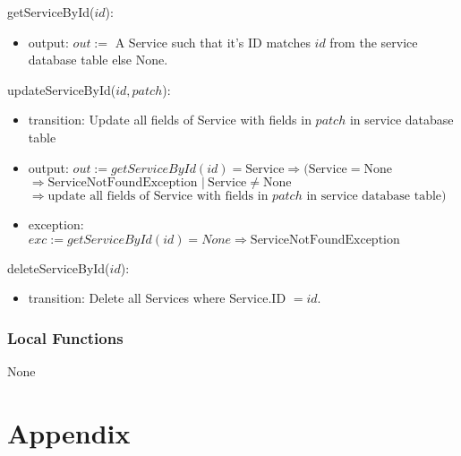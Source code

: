 \documentclass[12pt, titlepage]{article}
\begin{document}
\noindent getServiceById($id$):
\begin{itemize}
	\item output: $out :=$ A Service such that it's ID matches $id$ from the service database table else
	      None.
\end{itemize}

\noindent updateServiceById($id, patch$):
\begin{itemize}
	\item transition: Update all fields of Service with fields in $patch$ in service database table
	\item output: $out := getServiceById(id) = \text{Service} \Rightarrow (\text{Service} = \text{None} $ \\
		      $\Rightarrow \text{ServiceNotFoundException } |\ \text{Service} \neq \text{None}$ \\ $\Rightarrow
		      \text{update all fields of Service with fields in } patch \text{ in service database table})$
	\item exception: $exc := getServiceById(id) = None \Rightarrow \text{ServiceNotFoundException}$
\end{itemize}

\noindent deleteServiceById($id$):
\begin{itemize}
	\item transition: Delete all Services where Service.ID $= id$.
\end{itemize}

\subsubsection{Local Functions}

None

\newpage




\newpage

\section{Appendix}

\end{document}
